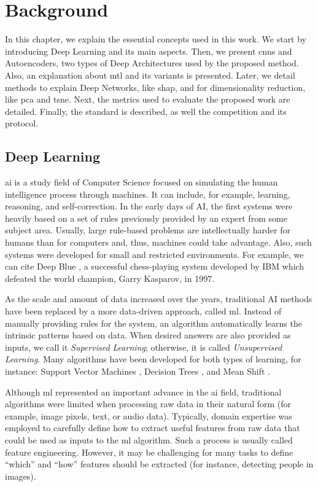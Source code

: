\section{Background} \label{sec:background}

In this chapter, we explain the essential concepts used in this work. We start by introducing Deep Learning and its main aspects. Then, we present \aclp{cnn} and Autoencoders, two types of Deep Architectures used by the proposed method. Also, an explanation about \acl{mtl} and its variants is presented. Later, we detail methods to explain Deep Networks, like \acs{shap}, and for dimensionality reduction, like \acl{pca} and \acs{tsne}. Next, the metrics used to evaluate the proposed work are detailed. Finally, the \icao standard is described, as well the \fvcongoing competition and its protocol.

\subsection{Deep Learning}

\acf{ai} is a study field of Computer Science focused on simulating the human intelligence process through machines. It can include, for example, learning, reasoning, and self-correction. In the early days of AI, the first systems were heavily based on a set of rules previously provided by an expert from some subject area. Usually, large rule-based problems are intellectually harder for humans than for computers and, thus, machines could take advantage. Also, such systems were developed for small and restricted environments. For example, we can cite Deep Blue \citep{hsu2002behind}, a successful chess-playing system developed by IBM which defeated the world champion, Garry Kasparov, in 1997.

As the scale and amount of data increased over the years, traditional AI methods have been replaced by a more data-driven approach, called \acf{ml}. Instead of manually providing rules for the system, an algorithm automatically learns the intrinsic patterns based on data. When desired answers are also provided as inputs, we call it \textit{Supervised Learning}; otherwise, it is called \textit{Unsupervised Learning}. Many algorithms have been developed for both types of learning, for instance: Support Vector Machines \citep{boser1992training}, Decision Trees \citep{breiman1984classification}, and Mean Shift \citep{fukunaga1975estimation}. 

Although \acl{ml} represented an important advance in the \acs{ai} field, traditional algorithms were limited when processing raw data in their natural form (for example, image pixels, text, or audio data). Typically, domain expertise was employed to carefully define how to extract useful features from raw data that could be used as inputs to the \acs{ml} algorithm. Such a process is usually called feature engineering. However, it may be challenging for many tasks to define ``which'' and ``how'' features should be extracted (for instance, detecting people in images).

